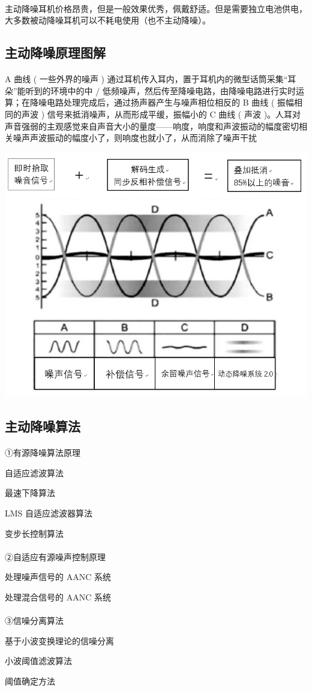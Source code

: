 \documentclass{ctexart}
\begin{document}
\paragraph{}
主动降噪耳机价格昂贵，但是一般效果优秀，佩戴舒适。但是需要独立电池供电，大多数被动降噪耳机可以不耗电使用（也不主动降噪）。
\subsection{主动降噪原理图解}
\paragraph{}
A 曲线 ( 一些外界的噪声 ) 通过耳机传入耳内，置于耳机内的微型话筒采集“耳朵”能听到的环境中的中 / 低频噪声，然后传至降噪电路，由降噪电路进行实时运算；在降噪电路处理完成后，通过扬声器产生与噪声相位相反的 B 曲线 ( 振幅相同的声波 ) 信号来抵消噪声，从而形成平缓，振幅小的 C 曲线 ( 声波 )。人耳对声音强弱的主观感觉来自声音大小的量度——响度，响度和声波振动的幅度密切相关噪声声波振动的幅度小了，则响度也就小了，从而消除了噪声干扰

\includegraphics[width = .8\textwidth]{b.png}

\subsection{主动降噪算法}
\paragraph{}
①有源降噪算法原理 

自适应滤波算法 

最速下降算法 

LMS 自适应滤波器算法 

变步长控制算法 

\paragraph{}
②自适应有源噪声控制原理  

处理噪声信号的 AANC 系统 

处理混合信号的 AANC 系统 

\paragraph{}
③信噪分离算法 

基于小波变换理论的信噪分离

小波阈值滤波算法 

阈值确定方法 
\end{document}
